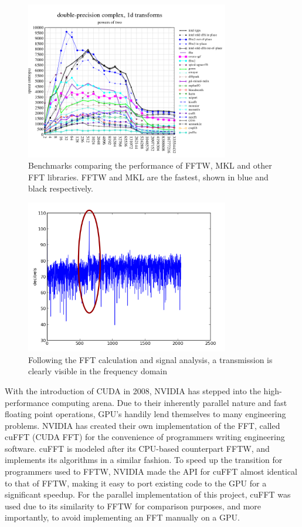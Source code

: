 \documentclass[conference]{IEEEtran}
\begin{document}
\begin{figure}[ht!]
\centering
\includegraphics[width=3.5in]{fftwmkl.png}
\caption{Benchmarks comparing the performance of FFTW, MKL and other FFT libraries. FFTW and MKL are the fastest, shown in blue and black respectively. \cite{fftw:benchmarks}}
\label{fig:fftwmkl}
\end{figure}


\begin{figure}[ht!]
\centering
\includegraphics[width=3.5in]{signalgraph.png}
\caption{Following the FFT calculation and signal analysis, a transmission is clearly visible in the frequency domain}
\label{fig:pipeline}
\end{figure}

With the introduction of CUDA in 2008, NVIDIA has stepped into the
high-performance computing arena. Due to their inherently parallel
nature and fast floating point operations, GPU's handily lend themselves 
to many engineering problems. NVIDIA has created their own implementation
of the FFT, called cuFFT (CUDA FFT) for the convenience of programmers
writing engineering software. cuFFT is modeled after its CPU-based counterpart
FFTW, and implements its algorithms in a similar fashion. To speed up
the transition for programmers used to FFTW, NVIDIA made the API for
cuFFT almost identical to that of FFTW, making it easy to port existing
code to the GPU for a significant speedup. For the parallel implementation
of this project, cuFFT was used due to its similarity to FFTW for comparison
purposes, and more importantly,  to avoid implementing an FFT manually
on a GPU. 
\end{document}
